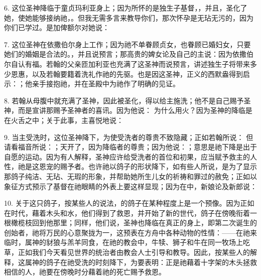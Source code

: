6. 这位圣神降临于童贞玛利亚身上；因为所怀的是独生子基督，，并且，圣化了她，使她能够接纳祂，。但我无需多言来教导你们，那次怀孕是无玷无污的，因为你们已学过。是加俾额尔对她说：\par

7. 这位圣神在依撒伯尔身上工作；因为祂不单眷顾贞女，也眷顾已婚妇女，只要她们的婚姻是合法的。，并且说预言；那高贵的婢女论及自己的主说：因为依撒伯尔自认有福。若翰的父亲匝加利亚也充满了这圣神而说预言，讲述独生子将带来多少恩惠，以及若翰要籍着洗礼作祂的先驱。也是因这圣神，正义的西默盎得到启示：；他亲手接抱祂，并在圣殿中为祂作了明确的见证。\par

8. 若翰从母腹中就充满了圣神，因此被圣化，得以给主施洗；他不是自己赐予圣神，而是宣讲那赐予圣神者的喜讯。因为他说： 为什么用火？因为圣神的降临是在火舌之中；关于此事，主喜悦地说：\par

9. 当主受洗时，这位圣神降下，为使受洗者的尊贵不致隐藏；正如若翰所说： 但请看福音所说：；天开了，因为降临者的尊贵；因为他说：；意思是祂下降是出于自愿的运动。因为有人解释，圣神应许给受洗者的首位和初果，应当赋予救主的人性，祂是这恩宠的赐予者。也许祂以鸽子的形状降下，如有些人所说，是为了显示那鸽子纯洁、无玷、无瑕的形象，并帮助她所生儿女的祈祷和罪过的赦免；正如以象征方式预示了基督在祂眼睛的外表上要这样显现；因为在中，新娘论及新郎说：\par

10. 关于这只鸽子，按某些人的说法，的鸽子在某种程度上是一个预像。因为正如在时代，藉着木头和水，他们得到了救恩，并开始了新的世代，鸽子在傍晚衔着一根橄榄枝回到他那里；同样，他们说，圣神也降临在真正的身上，即第二次诞生的创始者，祂将万民的心意聚拢为一，这预表在方舟中各种动物的性情：——在祂来临时，属神的豺狼与羔羊同食，在祂的教会中，牛犊、狮子和牛在同一牧场上吃草，正如我们今天看见世界的统治者由教会人士引导和教导。因此，按某些人的解释，这属神的鸽子在祂受洗的时刻降下，为要表明：正是祂藉着十字架的木头拯救相信的人，祂要在傍晚时分藉着祂的死亡赐予救恩。\par

